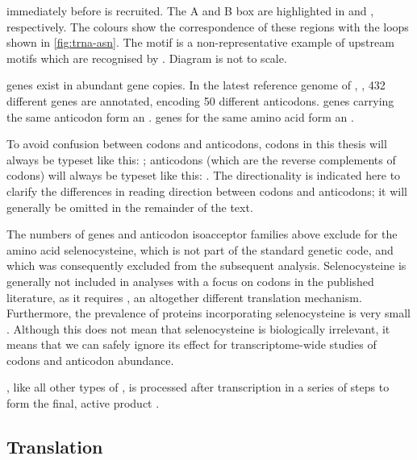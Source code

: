     {immediately before  is recruited. The A and B box are highlighted in
    \primaryname{} and \secondaryname{}, respectively. The colours show the
    correspondence of these regions with the loops shown in \cref{fig:trna-asn}.
    The  motif is a non-representative example of upstream motifs
    which are recognised by . Diagram is not to scale.}

\trna genes exist in abundant gene copies. In the latest reference genome of
\mmu,  \citep{Church:2009}, \num{432} different \trna genes are
annotated, encoding \num{50} different anticodons. \trna genes carrying the same
anticodon form an . \trna genes for the
same amino acid form an .

To avoid confusion between codons and anticodons, codons in this thesis will
always be typeset like this: ; anticodons (which are the
reverse complements of codons) will always be typeset like this:
. The directionality is indicated here to clarify the
differences in reading direction between codons and anticodons; it will
generally be omitted in the remainder of the text.

The numbers of \trna genes and anticodon isoacceptor families above exclude
\trna[s] for the amino acid selenocysteine, which is not part of the standard
genetic code, and which was consequently excluded from the subsequent analysis.
Selenocysteine is generally not included in analyses with a focus on codons in
the published literature, as it requires , an
altogether different translation mechanism. Furthermore, the prevalence of
proteins incorporating selenocysteine is very small \citep{Reeves:2009}.
Although this does not mean that selenocysteine is biologically irrelevant, it
means that we can safely ignore its effect for transcriptome-wide studies of
codons and anticodon abundance.

\trna, like all other types of \rna, is processed after transcription in a
series of steps to form the final, active \trna product \citep{Dalluge:1997}.

\subsection{Translation}


